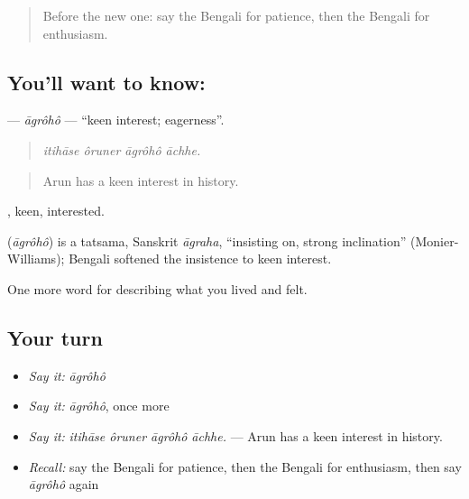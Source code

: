 \label{lesson:BN-C455-agroho}



\begin{quote}
Before the new one: say the Bengali for patience, then the Bengali for enthusiasm.
\end{quote}

\subsection*{You'll want to know: }
\textbf{} — \emph{āgrôhô} — \textquotedblleft{}keen interest; eagerness\textquotedblright{}.

\begin{quote}
   
\end{quote}

\begin{quote}
\emph{itihāse ôruner āgrôhô āchhe.}
\end{quote}

\begin{quote}
Arun has a keen interest in history.
\end{quote}

, keen, interested.

\begin{cousinweb}
\textbf{} (\emph{āgrôhô}) is a tatsama, Sanskrit \emph{āgraha}, \textquotedblleft{}insisting on, strong inclination\textquotedblright{} (Monier-Williams); Bengali softened the insistence to keen interest.
\end{cousinweb}

\begin{grammarlens}[title={What you've built}]
One more word for describing what you lived and felt.
\end{grammarlens}

\subsection*{Your turn}
\begin{itemize}
\raggedright
  \item \emph{Say it:} \emph{āgrôhô}
  \item \emph{Say it:} \emph{āgrôhô}, once more
  \item \emph{Say it:} \emph{itihāse ôruner āgrôhô āchhe.} — Arun has a keen interest in history.
  \item \emph{Recall:} say the Bengali for patience, then the Bengali for enthusiasm, then say \emph{āgrôhô} again
\end{itemize}

